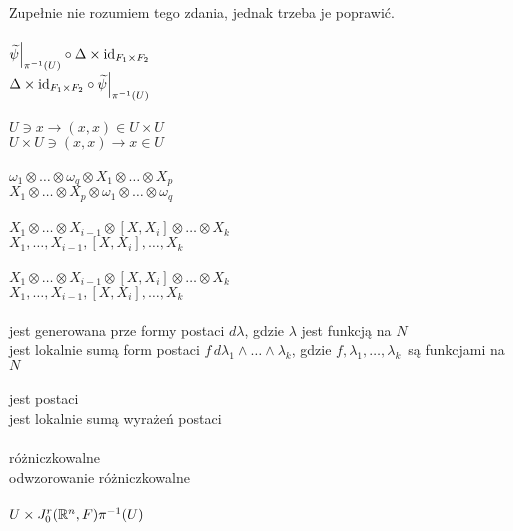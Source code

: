 \documentclass[a4paper,11pt]{article}
\begin{document}
Zupełnie nie rozumiem tego zdania, jednak trzeba je poprawić. \\
 \\[0.3em]
\Jest  $\widetilde{ \psi }\Big|_{ \pi^{ -1 }( U ) }
\circ \Delta \times \mathrm{id}_{ F_{ 1 } \times F_{ 2 } }$ \\[0.3em]
\Powin $\Delta \times \mathrm{id}_{ F_{ 1 } \times F_{ 2 } }
\circ \widetilde{ \psi }\Big|_{ \pi^{ -1 }( U ) }$ \\
 \\
\Jest  $U \ni x \to ( x, x ) \in U \times U$ \\[0.2em]
\Powin $U \times U \ni ( x, x ) \to x \in U$ \\
 \\
\Jest  $\omega_{ 1 } \otimes \ldots \otimes \omega_{ q } \otimes X_{ 1 }
\otimes \ldots \otimes X_{ p }$ \\
\Powin $X_{ 1 } \otimes \ldots \otimes X_{ p } \otimes \omega_{ 1 }
\otimes \ldots \otimes \omega_{ q }$ \\
 \\
\Jest  $X_{ 1 } \otimes \ldots \otimes X_{ i - 1 } \otimes [ X, X_{ i } ]
\otimes \ldots \otimes X_{ k }$ \\
\Powin $X_{ 1 }, \ldots, X_{ i - 1 }, [ X, X_{ i } ], \ldots, X_{ k }$ \\
 \\
\Jest  $X_{ 1 } \otimes \ldots \otimes X_{ i - 1 } \otimes [ X, X_{ i } ]
\otimes \ldots \otimes X_{ k }$ \\
\Powin $X_{ 1 }, \ldots, X_{ i - 1 }, [ X, X_{ i } ], \ldots, X_{ k }$ \\
 \\
\Jest  jest generowana prze formy postaci $d \lambda$, gdzie $\lambda$
jest funkcją na $N$ \\
\Powin jest lokalnie sumą form postaci
$f\, d\lambda_{ 1 } \wedge \ldots \wedge \lambda_{ k }$, gdzie
$f, \lambda_{ 1 }, \ldots, \lambda_{ k }$~są funkcjami na $N$ \\
 \\
\Jest  jest postaci \\
\Powin jest lokalnie sumą wyrażeń postaci \\
 \\
\Jest  różniczkowalne \\
\Powin odwzorowanie różniczkowalne \\
 \\
\Jest  $U \times J^{ r }_{ 0 }( \mathbb{R}^{ n }, F ) \pi^{ -1 }( U )$ \\
\end{document}
